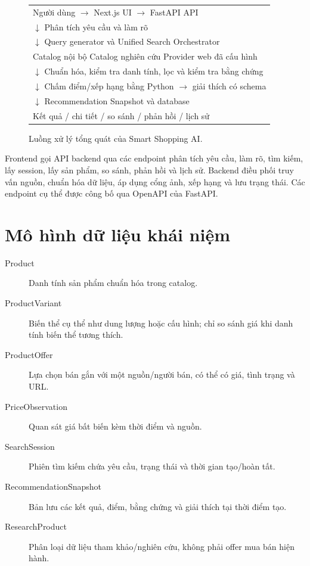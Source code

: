 \begin{figure}[htbp]
\centering
\begin{tabularx}{0.95\textwidth}{>{\raggedright\arraybackslash}X}
Người dùng \(\rightarrow\) Next.js UI \(\rightarrow\) FastAPI API\\
\(\downarrow\) Phân tích yêu cầu và làm rõ\\
\(\downarrow\) Query generator và Unified Search Orchestrator\\
Catalog nội bộ \quad Catalog nghiên cứu \quad Provider web đã cấu hình\\
\(\downarrow\) Chuẩn hóa, kiểm tra danh tính, lọc và kiểm tra bằng chứng\\
\(\downarrow\) Chấm điểm/xếp hạng bằng Python \(\rightarrow\) giải thích có schema\\
\(\downarrow\) Recommendation Snapshot và database\\
Kết quả / chi tiết / so sánh / phản hồi / lịch sử
\end{tabularx}
\caption{Luồng xử lý tổng quát của Smart Shopping AI.}
\label{fig:system-flow}
\end{figure}

Frontend gọi API backend qua các endpoint phân tích yêu cầu, làm rõ, tìm kiếm, lấy session, lấy sản phẩm, so sánh, phản hồi và lịch sử. Backend điều phối truy vấn nguồn, chuẩn hóa dữ liệu, áp dụng cổng ảnh, xếp hạng và lưu trạng thái. Các endpoint cụ thể được công bố qua OpenAPI của FastAPI.

\section{Mô hình dữ liệu khái niệm}

\begin{description}
  \item[Product] Danh tính sản phẩm chuẩn hóa trong catalog.
  \item[ProductVariant] Biến thể cụ thể như dung lượng hoặc cấu hình; chỉ so sánh giá khi danh tính biến thể tương thích.
  \item[ProductOffer] Lựa chọn bán gắn với một nguồn/người bán, có thể có giá, tình trạng và URL.
  \item[PriceObservation] Quan sát giá bất biến kèm thời điểm và nguồn.
  \item[SearchSession] Phiên tìm kiếm chứa yêu cầu, trạng thái và thời gian tạo/hoàn tất.
  \item[RecommendationSnapshot] Bản lưu các kết quả, điểm, bằng chứng và giải thích tại thời điểm tạo.
  \item[ResearchProduct] Phân loại dữ liệu tham khảo/nghiên cứu, không phải offer mua bán hiện hành.
\end{description}


